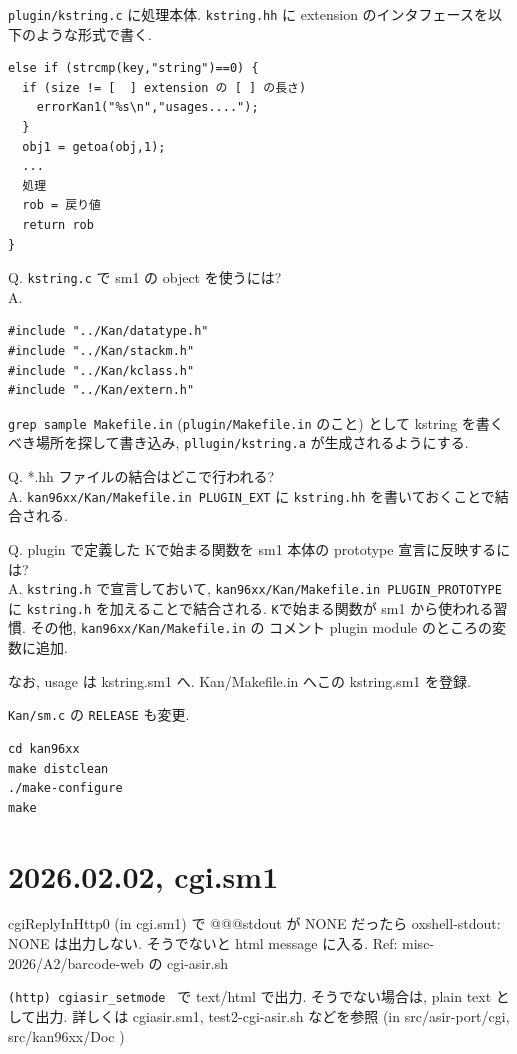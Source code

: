 \documentclass{jarticle}
\begin{document}
{\tt plugin/kstring.c} に処理本体.
{\tt kstring.hh} に extension のインタフェースを以下のような形式で書く.

\begin{verbatim}
else if (strcmp(key,"string")==0) {
  if (size != [  ] extension の [ ] の長さ) 
    errorKan1("%s\n","usages....");
  }
  obj1 = getoa(obj,1);
  ...
  処理
  rob = 戻り値
  return rob 
}
\end{verbatim}

\medbreak 
\noindent 
Q. {\tt kstring.c} で sm1 の object を使うには?  \\
A. 
\begin{verbatim}
#include "../Kan/datatype.h"
#include "../Kan/stackm.h"
#include "../Kan/kclass.h"
#include "../Kan/extern.h"
\end{verbatim}
\medbreak

{\tt grep sample Makefile.in}  
({\tt plugin/Makefile.in} のこと)
として kstring を書くべき場所を探して書き込み, {\tt pllugin/kstring.a} が生成されるようにする.


\medbreak
\noindent  
Q. *.hh ファイルの結合はどこで行われる? \\
A.   {\tt kan96xx/Kan/Makefile.in PLUGIN\_EXT} に {\tt kstring.hh} を書いておくことで結合される.  


\medbreak
\noindent
Q. plugin で定義した Kで始まる関数を sm1 本体の prototype 宣言に反映するには? \\
A. {\tt kstring.h} で宣言しておいて, 
   {\tt kan96xx/Kan/Makefile.in PLUGIN\_PROTOTYPE} に {\tt kstring.h} を加えることで結合される.
   {\tt K}で始まる関数が sm1 から使われる習慣.
   その他, {\tt kan96xx/Kan/Makefile.in} の コメント plugin module のところの変数に追加.

なお,
usage は kstring.sm1  へ. Kan/Makefile.in へこの kstring.sm1 を登録.

\medbreak
\noindent
{\tt Kan/sm.c} の {\tt RELEASE} も変更.
\begin{verbatim}
cd kan96xx
make distclean
./make-configure
make
\end{verbatim}

\section{2026.02.02, cgi.sm1}
   cgiReplyInHttp0 (in cgi.sm1) で  @@@stdout が NONE だったら oxshell-stdout: NONE は出力しない. そうでないと html message に入る.
   Ref: misc-2026/A2/barcode-web の cgi-asir.sh 

{\tt (http) cgiasir\_setmode } で
text/html で出力.
そうでない場合は, plain text として出力.
詳しくは
cgiasir.sm1, test2-cgi-asir.sh などを参照 (in src/asir-port/cgi, src/kan96xx/Doc  )
\end{document}
